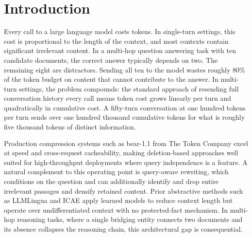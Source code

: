 \documentclass{article}
\begin{document}
\section{Introduction}

Every call to a large language model costs tokens. In single-turn settings,
this cost is proportional to the length of the context, and most contexts
contain significant irrelevant content. In a multi-hop question answering
task with ten candidate documents, the correct answer typically depends on
two. The remaining eight are distractors. Sending all ten to the model
wastes roughly 80\% of the token budget on content that cannot contribute
to the answer. In multi-turn settings, the problem compounds: the standard
approach of resending full conversation history every call means token cost
grows linearly per turn and quadratically in cumulative cost. A fifty-turn
conversation at one hundred tokens per turn sends over one hundred thousand
cumulative tokens for what is roughly five thousand tokens of distinct
information.

Production compression systems such as bear-1.1 from The Token Company
excel at speed and cross-request cacheability, making deletion-based
approaches well suited for high-throughput deployments where query
independence is a feature. A natural complement to this operating point
is query-aware rewriting, which conditions on the question and can
additionally identify and drop entire irrelevant passages and densify
retained content. Prior abstractive methods such as LLMLingua
\cite{jiang2023llmlingua} and ICAE \cite{ge2023context} apply learned
models to reduce context length but operate over undifferentiated context
with no protected-fact mechanism. In multi-hop reasoning tasks, where a
single bridging entity connects two documents and its absence collapses
the reasoning chain, this architectural gap is consequential.
\end{document}
